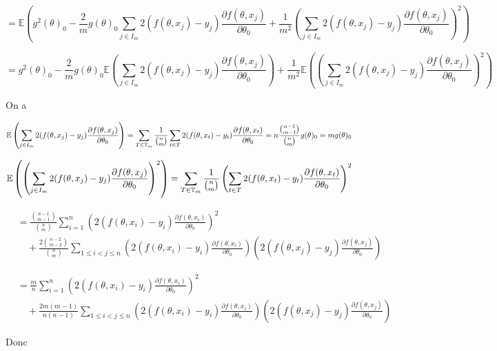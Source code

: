 \documentclass[a4paper,12pt]{article}
\begin{document}
$$ = \mathbb E\left( g^2(\theta)_0 - \frac{2}{m}g(\theta)_0 \sum_{j \in I_m} 2(f(\theta, x_j) - y_j) \frac{\partial f(\theta, x_j)}{\partial \theta_0} + \frac{1}{m^2} \left( \sum_{j \in I_m} 2(f(\theta, x_j) - y_j) \frac{\partial f(\theta, x_j)}{\partial \theta_0} \right)^2 \right) $$

$$ = g^2(\theta)_0 - \frac{2}{m}g(\theta)_0 \mathbb E\left( \sum_{j \in I_m} 2(f(\theta, x_j) - y_j) \frac{\partial f(\theta, x_j)}{\partial \theta_0} \right) + \frac{1}{m^2} \mathbb E\left( \left( \sum_{j \in I_m} 2(f(\theta, x_j) - y_j) \frac{\partial f(\theta, x_j)}{\partial \theta_0} \right)^2 \right) $$

On a

$$ \mathbb E\left( \sum_{j \in I_m} 2(f(\theta, x_j) - y_j) \frac{\partial f(\theta, x_j)}{\partial \theta_0} \right) = \sum_{T \in \mathbb{T}_m} \frac{1}{\tbinom{n}{m}} \sum_{t \in T} 2 (f(\theta, x_t) - y_t) \frac{\partial f(\theta, x_t)}{\partial \theta_0} = n \frac{\tbinom{n-1}{m-1}}{\tbinom{n}{m}} g(\theta)_0 = m g(\theta)_0 $$

$$ \mathbb E\left( \left( \sum_{j \in I_m} 2(f(\theta, x_j) - y_j) \frac{\partial f(\theta, x_j)}{\partial \theta_0} \right)^2 \right) = \sum_{T \in \mathbb{T}_m} \frac{1}{\tbinom{n}{m}} \left( \sum_{t \in T} 2(f(\theta, x_t) - y_t) \frac{\partial f(\theta, x_t)}{\partial \theta_0} \right)^2 $$

\begin{align*}
	&= \frac{\binom{n-1}{m-1}}{\binom{n}{m}} \sum^{n}_{i = 1} \left(2(f(\theta, x_i) - y_i) \frac{\partial f(\theta, x_i)}{\partial \theta_0}\right)^2 \\
	&\quad + \frac{2\binom{n-2}{m-2}}{\binom{n}{m}} \sum_{1 \leq i < j \leq n} \left(2(f(\theta, x_i) - y_i) \frac{\partial f(\theta, x_i)}{\partial \theta_0}\right) \left(2(f(\theta, x_j) - y_j) \frac{\partial f(\theta, x_j)}{\partial \theta_0}\right)
\end{align*}


\begin{align*}
	&= \frac{m}{n} \sum^{n}_{i = 1} \left(2(f(\theta, x_i) - y_i) \frac{\partial f(\theta, x_i)}{\partial \theta_0}\right)^2 \\
	&\quad + \frac{2m(m-1)}{n(n-1)} \sum_{1 \leq i < j \leq n} \left(2(f(\theta, x_i) - y_i) \frac{\partial f(\theta, x_i)}{\partial \theta_0}\right) \left(2(f(\theta, x_j) - y_j) \frac{\partial f(\theta, x_j)}{\partial \theta_0}\right)
\end{align*}


Donc
\end{document}
